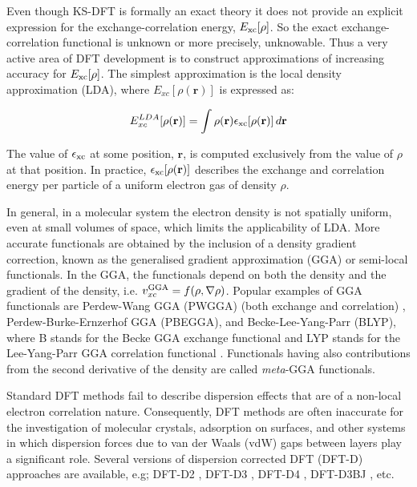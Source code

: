 \documentclass[../main.tex]{subfiles}
\begin{document}
Even though KS-DFT is formally an exact theory it does not provide an explicit expression for the exchange-correlation energy, $E_{\rm xc}[\rho]$. So the exact exchange-correlation functional is unknown or more precisely, unknowable. Thus a very active area of DFT development is to construct approximations of increasing accuracy for $E_{\rm xc}[\rho]$. The simplest approximation is the local density approximation (LDA), where $E_{xc}[\rho(\mathbf{r})]$ is expressed as:

\begin{equation}
    \label{eq:LDA}
    E_{xc}^{LDA}[\rho(\mathbf{r})] = \int\rho(\mathbf{r})\epsilon_{\rm xc}[\rho(\mathbf{r})]\,d\mathbf{r}
\end{equation}

The value of $\epsilon_{\rm xc}$ at some position, $\mathbf{r}$, is computed exclusively from the value of $\rho$ at that position. In practice, $\epsilon_{\rm xc}[\rho(\mathbf{r})]$ describes the exchange and correlation energy per particle of a uniform electron gas of density $\rho$. \cite{Dirac1930}

In general, in a molecular system the electron density is not spatially uniform, even at small volumes of space, which limits the applicability of LDA. More accurate functionals are obtained by the inclusion of a density gradient correction, known as the generalised gradient approximation (GGA) or semi-local functionals. In the GGA, the functionals depend on both the density and the gradient of the density, i.e. $v_{xc}^{\rm GGA} = f(\rho,\nabla\rho)$. Popular examples of GGA functionals are Perdew-Wang GGA (PWGGA) (both exchange and correlation) \cite{PerdewPRB92}, Perdew-Burke-Ernzerhof GGA (PBEGGA), \cite{PBE} and Becke-Lee-Yang-Parr (BLYP), where B stands for the Becke GGA exchange functional \cite{adb19883098} and LYP stands for the Lee-Yang-Parr GGA correlation functional \cite{cl1988785}. Functionals having also contributions from the second derivative of the density are called {\it meta}-GGA functionals. \cite{Perdew-PRL-1999} 

Standard DFT methods fail to describe dispersion effects that are of a non-local electron correlation nature. Consequently, DFT methods are often inaccurate for the investigation of molecular crystals, adsorption on surfaces, and other systems in which dispersion forces due to van der Waals (vdW) gaps between layers play a significant role. Several versions of dispersion corrected DFT (DFT-D) approaches are available, e.g; DFT-D2 \cite{Grimme-1}, DFT-D3 \cite{Grimme-2}, DFT-D4 \cite{Grimme-3}, DFT-D3BJ \cite{Grimme-4,Beke-1}, etc. 
\end{document}
